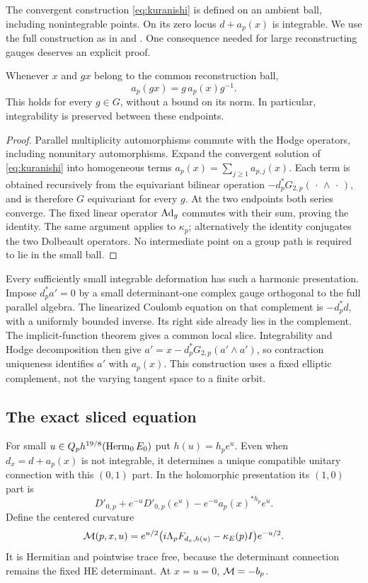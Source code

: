 The convergent construction \eqref{eq:kuranishi} is defined on an
ambient ball, including nonintegrable points. On its zero locus
$d+a_p(x)$ is integrable. We use the full construction as in
\cite[Theorem~8.7]{lam} and \cite[Lemma~2.1]{wuebben15}.
One consequence needed for large reconstructing gauges deserves
an explicit proof.

\begin{lemma}\label{lem:endpoint}
Whenever $x$ and $gx$ belong to the common reconstruction ball,
\[
 a_p(gx)=g\,a_p(x)g^{-1}.
\]
This holds for every $g\in G$, without a bound on its norm.
In particular, integrability is preserved between these endpoints.
\end{lemma}

\begin{proof}
Parallel multiplicity automorphisms commute with the Hodge operators,
including nonunitary automorphisms. Expand the convergent solution
of \eqref{eq:kuranishi} into homogeneous terms
$a_p(x)=\sum_{j\ge1}a_{p,j}(x)$. Each term is obtained recursively
from the equivariant bilinear operation
$-d_p^*G_{2,p}(\,\cdot\,\wedge\,\cdot\,)$, and is therefore
$G$ equivariant for every $g$. At the two endpoints both series
converge. The fixed linear operator $\operatorname{Ad}_g$ commutes with their
sum, proving the identity. The same argument applies to
$\kappa_p$; alternatively the identity conjugates the two
Dolbeault operators. No intermediate point on a group path is
required to lie in the small ball.
\end{proof}

Every sufficiently small integrable deformation has such a harmonic
presentation. Impose $d_p^*a'=0$ by a small determinant-one complex
gauge orthogonal to the full parallel algebra. The linearized
Coulomb equation on that complement is $-d_p^*d$, with a uniformly
bounded inverse. Its right side already lies in the complement.
The implicit-function theorem gives a common local slice.
Integrability and Hodge decomposition then give
$a'=x-d_p^*G_{2,p}(a'\wedge a')$, so contraction uniqueness identifies
$a'$ with $a_p(x)$. This construction uses a fixed elliptic
complement, not the varying tangent space to a finite orbit.

\subsection{The exact sliced equation}
For small $u\in Q_p h^{19/8}(\operatorname{Herm}_0E_0)$ put $h(u)=h_pe^u$.
Even when $d_x=d+a_p(x)$ is not integrable, it determines a unique
compatible unitary connection with this $(0,1)$ part.
In the holomorphic presentation its $(1,0)$ part is
\begin{equation}\label{eq:chern}
 D'_{0,p}+e^{-u}D'_{0,p}(e^u)
                    -e^{-u}a_p(x)^{*h_p}e^u.
\end{equation}
Define the centered curvature
\begin{equation}\label{eq:centered}
 \mathcal M(p,x,u)=e^{u/2}
       \bigl(i\Lambda_pF_{d_x,h(u)}-\kappa_E(p)I\bigr)e^{-u/2}.
\end{equation}
It is Hermitian and pointwise trace free, because the determinant
connection remains the fixed HE determinant. At $x=u=0$,
$\mathcal M=-b_p$.

